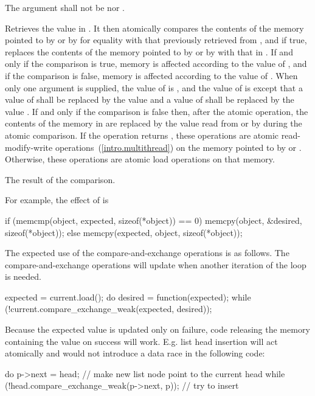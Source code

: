\begin{itemdescr}
\pnum
\requires The  argument shall not be  nor
.

\pnum
\effects Retrieves the value in . It then atomically
compares the contents of the memory pointed to by  or by 
for equality with that previously retrieved from ,
and if true, replaces the contents of the memory pointed to
by  or by  with that in .
If and only if the comparison is true, memory is affected according to the
value of , and if the comparison is false, memory is affected according
to the value of . When only one  argument is
supplied, the value of  is , and the value of
 is  except that a value of 
shall be replaced by the value  and a value of
 shall be replaced by the value
.
If and only if the comparison is false then, after the atomic operation,
the contents of the memory in  are replaced by the value
read from  or by  during the atomic comparison.
If the operation returns , these
operations are atomic read-modify-write
operations~(\ref{intro.multithread}) on the memory
pointed to by  or .
Otherwise, these operations are atomic load operations on that memory.

\pnum
\returns The result of the comparison.

\pnum
\begin{note} For example, the effect of
 is
\begin{codeblock}
if (memcmp(object, expected, sizeof(*object)) == 0)
  memcpy(object, &desired, sizeof(*object));
else
  memcpy(expected, object, sizeof(*object));
\end{codeblock}
\end{note}
\begin{example} The expected use of the compare-and-exchange operations is as follows. The
compare-and-exchange operations will update  when another iteration of
the loop is needed.
\begin{codeblock}
expected = current.load();
do {
  desired = function(expected);
} while (!current.compare_exchange_weak(expected, desired));
\end{codeblock}
\end{example}
\begin{example} Because the expected value is updated only on failure,
code releasing the memory containing the  value on success will work.
E.g. list head insertion will act atomically and would not introduce a
data race in the following code:
\begin{codeblock}
do {
  p->next = head; // make new list node point to the current head
} while (!head.compare_exchange_weak(p->next, p)); // try to insert
\end{codeblock}
\end{example}


\end{itemdescr}
